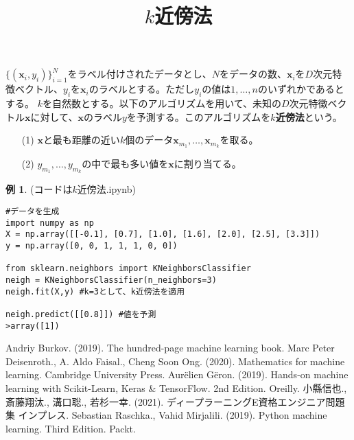 \documentclass{jsarticle}
\theoremstyle{definition}
\newtheorem{ex}{例}[section]
\begin{document}
\title{$k$近傍法}
\date{}
\maketitle
$\{(\mathbf{x}_{i},y_{i})\}_{i=1}^{N}$をラベル付けされたデータとし、$N$をデータの数、$\mathbf{x}_{i}$を$D$次元特徴ベクトル、$y_{i}$を$\mathbf{x}_{i}$のラベルとする。ただし$y_{i}$の値は$1,\dots,n$のいずれかであるとする。
$k$を自然数とする。以下のアルゴリズムを用いて、未知の$D$次元特徴ベクトル$\mathbf{x}$に対して、$\mathbf{x}$のラベル$y$を予測する。このアルゴリズムを\textbf{$k$近傍法}という。
\begin{enumerate}
\item[(1)] $\mathbf{x}$と最も距離の近い$k$個のデータ$\mathbf{x}_{m_{1}},\dots,\mathbf{x}_{m_{k}}$を取る。
\item[(2)] $y_{m_{1}},\dots,y_{m_{k}}$の中で最も多い値を$\mathbf{x}$に割り当てる。
\end{enumerate}
\begin{ex} (コードは$k$近傍法.ipynb) 
\begin{verbatim}
#データを生成
import numpy as np
X = np.array([[-0.1], [0.7], [1.0], [1.6], [2.0], [2.5], [3.3]])
y = np.array([0, 0, 1, 1, 1, 0, 0])

from sklearn.neighbors import KNeighborsClassifier
neigh = KNeighborsClassifier(n_neighbors=3) 
neigh.fit(X,y) #k=3として、k近傍法を適用

neigh.predict([[0.8]]) #値を予測
>array([1])
\end{verbatim}
\end{ex}
\begin{thebibliography}{99}
 Andriy Burkov. (2019). The hundred-page machine learning book.
 Marc Peter Deisenroth., A. Aldo Faisal., Cheng Soon Ong. (2020). Mathematics for machine learning. Cambridge University Press.
 Aur\"{e}lien G\"{e}ron. (2019). Hands-on machine learning with Scikit-Learn, Keras \&  TensorFlow. 2nd Edition. Oreilly.
 小縣信也., 斎藤翔汰., 溝口聡., 若杉一幸. (2021). ディープラーニングE資格エンジニア問題集 インプレス.
 Sebastian Raschka., Vahid Mirjalili. (2019). Python machine learning. Third Edition. Packt.

\end{thebibliography}
\end{document}
